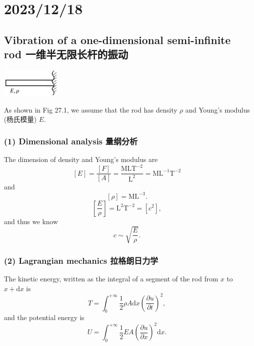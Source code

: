 \chapter{2023/12/18}\label{20231218}

\section{Vibration of a one-dimensional semi-infinite rod
一维半无限长杆的振动}\label{vibration-of-a-one-dimensional-semi-infinite-rod-ux4e00ux7ef4ux534aux65e0ux9650ux957fux6746ux7684ux632fux52a8}

\begin{center}
    \includegraphics[height=40pt]{assets/One-dimensional_semi-infinite_rod.png}
\end{center}

As shown in Fig 27.1, we assume that the rod has density \(\rho\) and Young's modulus
(杨氏模量) \(E\).

\subsection*{(1) Dimensional analysis
量纲分析}\label{dimensional-analysis-ux91cfux7eb2ux5206ux6790}

The dimension of density and Young's modulus are
\[[E] = \frac{[F]}{[A]} = \frac{\mathrm{MLT^{-2}}}{\mathrm{L^2}} = \mathrm{ML^{-1}T^{-2}}\]
and \[[\rho] = \mathrm{ML^{-3}}.\]
\[\left[ \frac{E}{\rho} \right] = \mathrm{L^2 T^{-2}} = [c^2],\] and
thus we know \[c \sim \sqrt{\frac{E}{\rho}}.\]

\subsection*{(2) Lagrangian mechanics
拉格朗日力学}\label{lagrangian-mechanics-ux62c9ux683cux6717ux65e5ux529bux5b66}

The kinetic energy, written as the integral of a segment of the rod from
\(x\) to \(x + \mathrm{d}x\) is
\[T = \int_{0}^{+\infty} \frac{1}{2} \rho A \mathrm{d}x \left( \frac{\partial u}{\partial t} \right)^2,\]
and the potential energy is
\[U = \int_{0}^{+\infty} \frac{1}{2} EA \left( \frac{\partial u}{\partial x} \right)^2 \mathrm{d}x.\]

